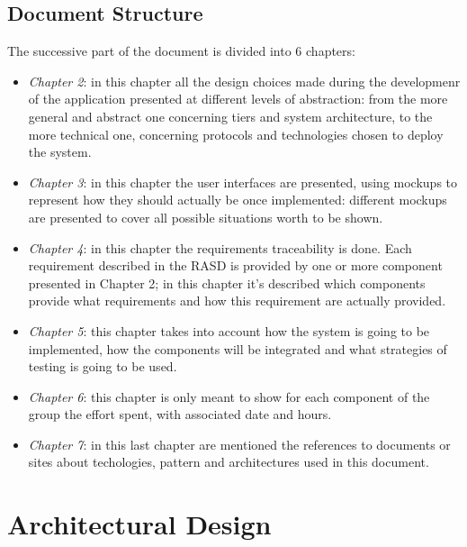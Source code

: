 \documentclass[a4paper]{report}
\begin{document}
\section{Document Structure}
The successive part of the document is divided into 6 chapters:
\begin{itemize}
\item \textit{Chapter 2}: in this chapter all the design choices made during the developmenr of the application presented at different levels of abstraction: from the more general and abstract one concerning tiers and system architecture, to the more technical one, concerning protocols and technologies chosen to deploy the system.
\item \textit{Chapter 3}: in this chapter the user interfaces are presented, using mockups to represent how they should actually be once implemented: different mockups are presented to cover all possible situations worth to be shown.
\item \textit{Chapter 4}: in this chapter the requirements traceability is done. Each requirement described in the RASD is provided by one or more component presented in Chapter 2; in this chapter it's described which components provide what requirements and how this requirement are actually provided.
\item \textit{Chapter 5}: this chapter takes into account how the system is going to be implemented, how the components will be integrated and what strategies of testing is going to be used.
\item \textit{Chapter 6}: this chapter is only meant to show for each component of the group the effort spent, with associated date and hours.
\item \textit{Chapter 7}: in this last chapter are mentioned the references to documents or sites about techologies, pattern and architectures used in this document.

\end{itemize}
\chapter{Architectural Design}
\end{document}
